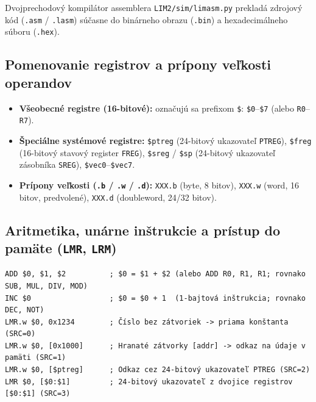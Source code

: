 \documentclass[11pt,a4paper]{article}
\newcommand{\reg}[1]{\texttt{#1}}
\begin{document}
Dvojprechodový kompilátor assemblera \texttt{LIM2/sim/limasm.py} prekladá zdrojový kód (\texttt{.asm} / \texttt{.lasm}) súčasne do binárneho obrazu (\texttt{.bin}) a hexadecimálneho súboru (\texttt{.hex}).

\subsection{Pomenovanie registrov a prípony veľkosti operandov}
\begin{itemize}
  \item \textbf{Všeobecné registre (16-bitové):} označujú sa prefixom \texttt{\$}: \texttt{\$0}--\texttt{\$7} (alebo \texttt{R0}--\texttt{R7}).
  \item \textbf{Špeciálne systémové registre:} \texttt{\$ptreg} (24-bitový ukazovateľ \reg{PTREG}), \texttt{\$freg} (16-bitový stavový register \reg{FREG}), \texttt{\$sreg} / \texttt{\$sp} (24-bitový ukazovateľ zásobníka \reg{SREG}), \texttt{\$vec0}--\texttt{\$vec7}.
  \item \textbf{Prípony veľkosti (\texttt{.b} / \texttt{.w} / \texttt{.d}):} \texttt{XXX.b} (byte, 8 bitov), \texttt{XXX.w} (word, 16 bitov, predvolené), \texttt{XXX.d} (doubleword, 24/32 bitov).
\end{itemize}

\subsection{Aritmetika, unárne inštrukcie a prístup do pamäte (\texttt{LMR}, \texttt{LRM})}
\begin{verbatim}
ADD $0, $1, $2          ; $0 = $1 + $2 (alebo ADD R0, R1, R1; rovnako SUB, MUL, DIV, MOD)
INC $0                  ; $0 = $0 + 1  (1-bajtová inštrukcia; rovnako DEC, NOT)
LMR.w $0, 0x1234        ; Číslo bez zátvoriek -> priama konštanta (SRC=0)
LMR.w $0, [0x1000]      ; Hranaté zátvorky [addr] -> odkaz na údaje v pamäti (SRC=1)
LMR.w $0, [$ptreg]      ; Odkaz cez 24-bitový ukazovateľ PTREG (SRC=2)
LMR $0, [$0:$1]         ; 24-bitový ukazovateľ z dvojice registrov [$0:$1] (SRC=3)
\end{verbatim}
\end{document}
